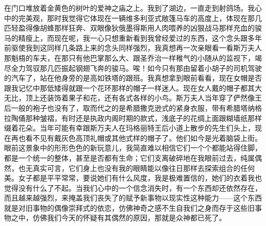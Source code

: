 在门口堆放着金黄色的树叶的爱神之庙之上。我到了湖边，一直走到射鸽场。我心中的完美观，那时我觉得它体现在一辆维多利亚式敞篷马车的高度上，体现在那几匹轻盈得像胡蜂那样狂奔、双眼像狄俄墨得斯用人肉喂养的凶狠战马那样充血的骏马的精瘦上，而现在呢，我一心只想重新看到我曾经爱过的东西，这个念头跟多年前驱使我到这同样几条路上来的念头同样强烈，我真想再一次亲眼看一看斯万夫人那魁梧的车夫，在那只有他巴掌那么大、跟圣乔治一样稚气的小随从的监视下，竭尽全力驾驭那几匹振起钢翅飞奔的骏马。唉！如今只有那由留着小胡子的司机驾驶的汽车了，站在他身旁的是高如铁塔的跟班。我真想拿到眼前看看，现在女帽是否跟我记忆中那低矮得就跟一个花环那样的帽子一样迷人。现在女人戴的帽子都其大无比，顶上还装饰着果子和花，还有各式各样的小鸟。斯万夫人当年穿了俨然像王后一般的袍子也没有了，取而代之的是希腊撒克逊式的紧身衣服，带有希腊塔纳格拉陶俑那种皱褶，有时还是执政内阁时期的款式，浅底子的花绸上面跟糊墙纸那样缀着花朵。当年可能有幸跟斯万夫人在玛格丽特王后小道上散步的先生们头上，现在再也看不见有戴灰色高顶礼帽或其他式样的帽子了。他们如今是光着脑袋上街。眼前这景象中的形形色色的新玩意儿，我简直难以相信它们一个个都能站得住脚，都是一个统一的整体，甚至是否都有生命；它们支离破碎地在我眼前过去，纯属偶然，也无真实可言，它们身上也没有我的眼睛能以像往日那样去探索组合的任何美。女子都是平平常常，要说她们有什么风度，我是极难置信的，她们的衣着我也觉得没有什么了不起。当我们心中的一个信念消失时，有一个东西却还依然存在，而且越来越强烈，来掩盖我们丧失了的赋予新事物以现实性这种能力——这个东西就是对旧事物的偶像崇拜式的依恋，仿佛神奇之感不生自我们之身而存于这些旧事物之中，仿佛我们今天的怀疑有其偶然的原因，那就是众神都已死了。
